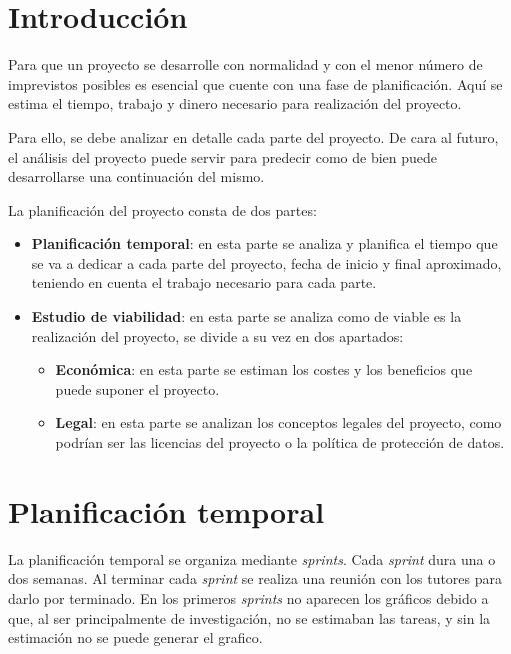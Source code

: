 
\section{Introducción}
Para que un proyecto se desarrolle con normalidad y con el menor número de
imprevistos posibles es esencial que cuente con una fase de planificación. Aquí
se estima el tiempo, trabajo y dinero necesario para realización del proyecto.

Para ello, se debe analizar en detalle cada parte del proyecto. De cara al 
futuro, el análisis del proyecto puede servir para predecir como de bien puede 
desarrollarse una continuación del mismo.

La planificación del proyecto consta de dos partes:
\begin{itemize}
	\tightlist
	\item \textbf{Planificación temporal}: en esta parte se analiza y planifica el
	tiempo que se va a dedicar a cada parte del proyecto, fecha de inicio y final
	aproximado, teniendo en cuenta el trabajo necesario para cada parte.
	\item \textbf{Estudio de viabilidad}: en esta parte se analiza como de viable
	es la realización del proyecto, se divide a su vez en dos apartados:
	
	\begin{itemize}
		\tightlist
		\item \textbf{Económica}: en esta parte se estiman los costes y los beneficios
		que puede suponer el proyecto.
		\item \textbf{Legal}: en esta parte se analizan los conceptos legales del
		proyecto, como podrían ser las licencias del proyecto o la política de
		protección de datos.
	\end{itemize}
\end{itemize}

\section{Planificación temporal}
La planificación temporal se organiza mediante \textit{sprints}. Cada
\textit{sprint} dura una o dos semanas. Al terminar cada \textit{sprint} se
realiza una reunión con los tutores para darlo por terminado. En los primeros 
\textit{sprints} no aparecen los gráficos debido a que, al ser principalmente 
de investigación, no se estimaban las tareas, y sin la estimación no se puede 
generar el grafico.

